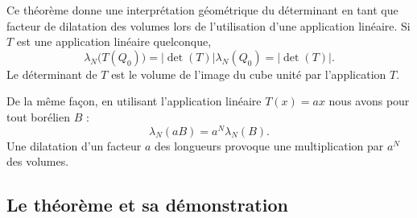 Ce théorème donne une interprétation géométrique du déterminant en tant que facteur de dilatation des volumes lors de l'utilisation d'une application linéaire. Si \( T\) est une application linéaire quelconque,
\begin{equation}
	\lambda_N\big( T(Q_0) \big)=| \det(T) |\lambda_N(Q_0)=| \det(T) |.
\end{equation}
Le déterminant de \( T\) est le volume de l'image du cube unité par l'application \( T\).

De la même façon, en utilisant l'application linéaire \( T(x)=ax\) nous avons pour tout borélien \( B\) :
\begin{equation}
	\lambda_N(aB)=a^N\lambda_N(B).
\end{equation}
Une dilatation d'un facteur \( a\) des longueurs provoque une multiplication par \( a^N\) des volumes.

\subsection{Le théorème et sa démonstration}


